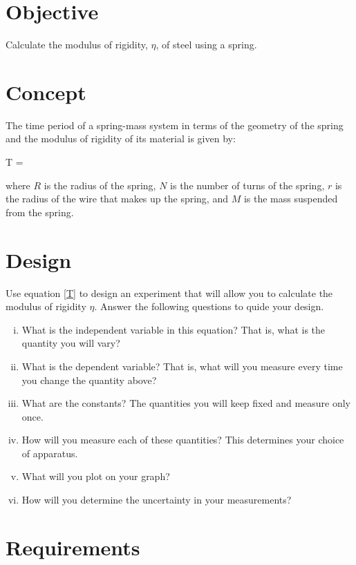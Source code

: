 \setcounter{equation}{0}

\section*{Objective}

    Calculate the modulus of rigidity, $\eta$, of steel using a spring.


\section*{Concept}

    The time period of a spring-mass system in terms of the geometry of the spring and the modulus of rigidity of its material is given by:

    \beq \label{T}
        T =  
    \eeq

    where $R$ is the radius of the spring, $N$ is the number of turns of the spring, $r$ is the radius of the wire that makes up the spring, and $M$ is the mass suspended from the spring.


\section*{Design}

    Use equation \eqref{T} to design an experiment that will allow you to calculate the modulus of rigidity $\eta$. Answer the following questions to quide your design.

    \begin{enumerate}[(i)]
        \item What is the independent variable in this equation? That is, what is the quantity you will vary?
        \item What is the dependent variable? That is, what will you measure every time you change the quantity above?
        \item What are the constants? The quantities you will keep fixed and measure only once.
        \item How will you measure each of these quantities? This determines your choice of apparatus.
        \item What will you plot on your graph?
        \item How will you determine the uncertainty in your measurements?
    \end{enumerate}

\section*{Requirements}

